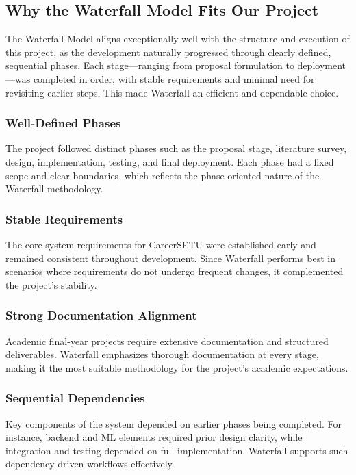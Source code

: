 \documentclass[12pt,a4paper]{report}
\begin{document}
\subsection{Why the Waterfall Model Fits Our Project}
The Waterfall Model aligns exceptionally well with the structure and execution of this project, as the development naturally progressed through clearly defined, sequential phases. Each stage—ranging from proposal formulation to deployment—was completed in order, with stable requirements and minimal need for revisiting earlier steps. This made Waterfall an efficient and dependable choice.

\subsubsection*{Well-Defined Phases}
The project followed distinct phases such as the proposal stage, literature survey, design, implementation, testing, and final deployment. Each phase had a fixed scope and clear boundaries, which reflects the phase-oriented nature of the Waterfall methodology.

\subsubsection*{Stable Requirements}
The core system requirements for CareerSETU were established early and remained consistent throughout development. Since Waterfall performs best in scenarios where requirements do not undergo frequent changes, it complemented the project’s stability.

\subsubsection*{Strong Documentation Alignment}
Academic final-year projects require extensive documentation and structured deliverables. Waterfall emphasizes thorough documentation at every stage, making it the most suitable methodology for the project's academic expectations.

\subsubsection*{Sequential Dependencies}
Key components of the system depended on earlier phases being completed. For instance, backend and ML elements required prior design clarity, while integration and testing depended on full implementation. Waterfall supports such dependency-driven workflows effectively.
\end{document}
